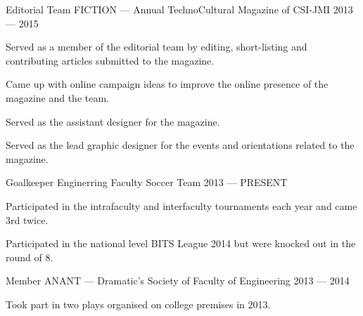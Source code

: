 \begin{cventries}
  \cventry%
    {Editorial Team} %
    {FICTION --- Annual TechnoCultural Magazine of CSI-JMI} %
    {} %
    {2013 --- 2015} %
    {%
      \begin{cvitems} %
        \item{Served as a member of the editorial team by editing, short-listing and contributing articles submitted to the magazine.}
        \item{Came up with online campaign ideas to improve the online presence of the magazine and the team.}
        \item{Served as the assistant designer for the magazine.}
        \item{Served as the lead graphic designer for the events and orientations related to the magazine.}
      \end{cvitems}
    }

  \cventry%
    {Goalkeeper} %
    {Enginerring Faculty Soccer Team} %
    {} %
    {2013 --- PRESENT} %
    {%
      \begin{cvitems} %
        \item{Participated in the intrafaculty and interfaculty tournaments each year and came 3rd twice.}
        \item{Participated in the national level BITS League 2014 but were knocked out in the round of 8.}
      \end{cvitems}
    }

  \cventry%
    {Member} %
    {ANANT --- Dramatic's Society of Faculty of Engineering} %
    {} %
    {2013 --- 2014} %
    {%
      \begin{cvitems} %
        \item{Took part in two plays organised on college premises in 2013.}
      \end{cvitems}
    }

\end{cventries}

